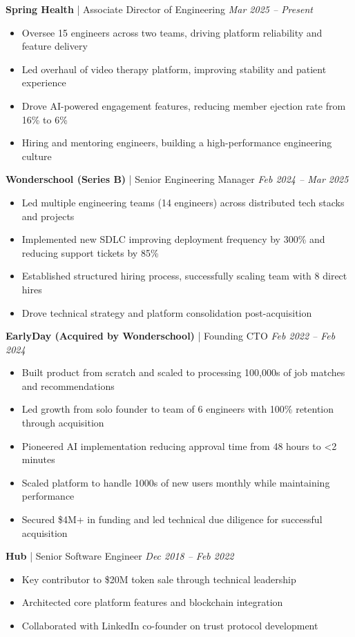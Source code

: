 \documentclass[letterpaper,10pt]{article}
\begin{document}
\textbf{Spring Health} | Associate Director of Engineering \hfill \textit{Mar 2025 -- Present}
\begin{itemize}[leftmargin=*, nosep]
    \item Oversee 15 engineers across two teams, driving platform reliability and feature delivery
    \item Led overhaul of video therapy platform, improving stability and patient experience
    \item Drove AI-powered engagement features, reducing member ejection rate from 16\% to 6\%
    \item Hiring and mentoring engineers, building a high-performance engineering culture
\end{itemize}

\textbf{Wonderschool (Series B)} | Senior Engineering Manager \hfill \textit{Feb 2024 -- Mar 2025}
\begin{itemize}[leftmargin=*, nosep]
    \item Led multiple engineering teams (14 engineers) across distributed tech stacks and projects
    \item Implemented new SDLC improving deployment frequency by 300\% and reducing support tickets by 85\%
    \item Established structured hiring process, successfully scaling team with 8 direct hires
    \item Drove technical strategy and platform consolidation post-acquisition
\end{itemize}

\textbf{EarlyDay (Acquired by Wonderschool)} | Founding CTO \hfill \textit{Feb 2022 -- Feb 2024}
\begin{itemize}[leftmargin=*, nosep]
    \item Built product from scratch and scaled to processing 100,000s of job matches and recommendations
    \item Led growth from solo founder to team of 6 engineers with 100\% retention through acquisition
    \item Pioneered AI implementation reducing approval time from 48 hours to <2 minutes
    \item Scaled platform to handle 1000s of new users monthly while maintaining performance
    \item Secured \$4M+ in funding and led technical due diligence for successful acquisition
\end{itemize}

\textbf{Hub} | Senior Software Engineer \hfill \textit{Dec 2018 -- Feb 2022}
\begin{itemize}[leftmargin=*, nosep]
    \item Key contributor to \$20M token sale through technical leadership
    \item Architected core platform features and blockchain integration
    \item Collaborated with LinkedIn co-founder on trust protocol development
\end{itemize}
\end{document}
